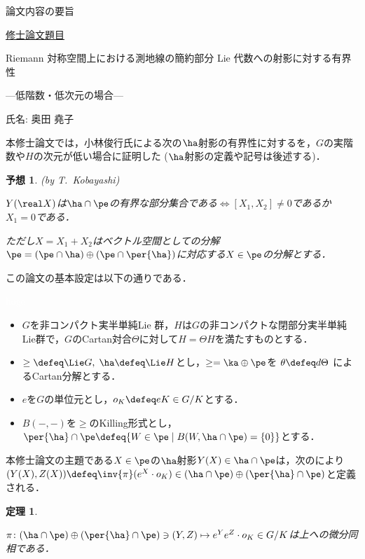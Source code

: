 \documentclass[12pt,dvipdfmx,uplatex]{jsarticle}
\newcounter{countabst}
\newtheorem{yosou-a}[countabst]{予想}
\newtheorem{thm-a}[countabst]{定理}
\begin{document}
% 
\begin{center}
論文内容の要旨
\end{center}

\noindent\underline{修士論文題目}

\begin{center}
Riemann 対称空間上における測地線の簡約部分 Lie 代数への射影に対する有界性

---低階数・低次元の場合---
\end{center}

\noindent 氏名: 奥田 堯子

\vspace{1em}

本修士論文では，小林俊行氏による次の$\ha$射影の有界性に対するを，$G$の実階数や$H$の次元が低い場合に証明した ($\ha$射影の定義や記号は後述する)．

\begin{yosou-a}(by T.~Kobayashi)\label{yosou:1121}
  
  $Y(\real X)$は$ \ha\cap \pe$の有界な部分集合である$ \iff   [X_1, X_2]\neq 0 $であるか$X_1 = 0$である．

  ただし$X = X_1 + X_2 $はベクトル空間としての分解$\pe =(\pe\cap \ha)\oplus(\pe\cap\per{\ha}) $に対応する$X\in \pe$の分解とする．
\end{yosou-a}

この論文の基本設定は以下の通りである．
\begin{nttdef*}\textcolor{white}{hoge}
  
  \vspace{-1em}
  \begin{itemize}
  \item $G$を非コンパクト実半単純Lie 群，$H$は$G$の非コンパクトな閉部分実半単純Lie群で，$G$のCartan対合$\Theta$に対して$H = \Theta H$を満たすものとする．
  \item $\ge \defeq \Lie G,\; \ha \defeq \Lie H$とし，$\ge = \ka\oplus \pe$を $\theta \defeq d\Theta$ によるCartan分解とする．
  \item  $e$を$G$の単位元とし，$o_K \defeq eK\in G/K$とする．
  \item $B({-}, {-}) $を$\ge$のKilling形式とし，$\per{\ha}\cap \pe \defeq \{W\in \pe\mid B(W, \ha\cap \pe) = \{0\}\} $とする．
  \end{itemize}
  
\end{nttdef*}

本修士論文の主題である$X\in \pe$の$\ha$射影$Y(X)\in \ha\cap \pe $は，次のにより$(Y(X), Z(X))\defeq \inv{\pi}(e^X\cdot o_K)\in (\ha\cap\pe)\oplus (\per{\ha}\cap \pe)$と定義される．
\begin{thm-a}\cite[Lemma~6.1]{kob89}\label{thm:kob89-lem6.1}

  $\pi\colon  (\ha\cap\pe)\oplus (\per{\ha}\cap \pe) \ni (Y, Z)\mapsto e^{Y}e^{Z}\cdot o_K \in G/K $は上への微分同相である．
\end{thm-a}
\end{document}
